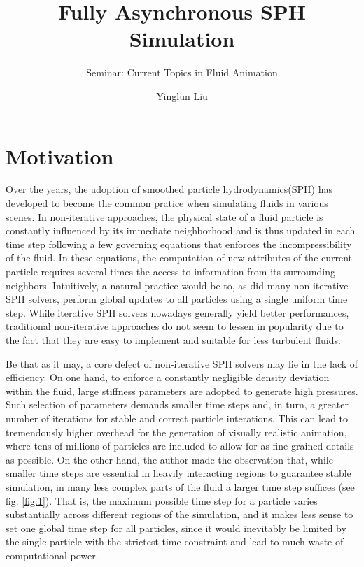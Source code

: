 \documentclass[
	11pt, 
	DIV10,
	ngerman,
	a4paper, 
	oneside, 
	headings=normal, 
	captions=tableheading,
	final, 
	numbers=noenddot
]{scrartcl}
\title{Fully Asynchronous SPH Simulation}
\subtitle{\vspace{0.5cm}Seminar: Current Topics in Fluid Animation}
\author{Yinglun Liu}
\begin{document}
\maketitle


\section{Motivation}

Over the years, the adoption of smoothed particle hydrodynamics(SPH) has developed to become the common pratice when simulating fluids in various scenes. In non-iterative approaches, the physical state of a fluid particle is constantly influenced by its immediate neighborhood and is thus updated in each time step following a few governing equations that enforces the incompressibility of the fluid. In these equations, the computation of new attributes of the current particle requires several times the access to information from its surrounding neighbors. Intuitively, a natural practice would be to, as did many non-iterative SPH solvers, perform global updates to all particles using a single uniform time step. While iterative SPH solvers nowadays generally yield better performances, traditional non-iterative approaches do not seem to lessen in popularity due to the fact that they are easy to implement and suitable for less turbulent fluids.
\par
Be that as it may, a core defect of non-iterative SPH solvers may lie in the lack of efficiency. On one hand, to enforce a constantly negligible density deviation within the fluid, large stiffness parameters are adopted to generate high pressures. Such selection of parameters demands smaller time steps and, in turn, a greater number of iterations for stable and correct particle interations. This can lead to tremendously higher overhead for the generation of visually realistic animation, where tens of millions of particles are included to allow for as fine-grained details as possible. On the other hand, the author made the observation that, while smaller time steps are essential in heavily interacting regions to guarantee stable simulation, in many less complex parts of the fluid a larger time step suffices (see fig. \ref{fig:1}). That is, the maximum possible time step for a particle varies substantially across different regions of the simulation, and it makes less sense to set one global time step for all particles, since it would inevitably be limited by the single particle with the strictest time constraint and lead to much waste of computational power.
\end{document}
